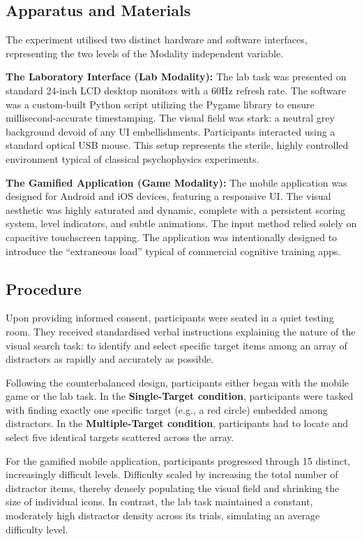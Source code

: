 \documentclass[11pt,a4paper]{article}
\begin{document}
\subsection{Apparatus and Materials}
The experiment utilised two distinct hardware and software interfaces, representing the two levels of the Modality independent variable.

\textbf{The Laboratory Interface (Lab Modality):}
The lab task was presented on standard 24-inch LCD desktop monitors with a 60Hz refresh rate. The software was a custom-built Python script utilizing the Pygame library to ensure millisecond-accurate timestamping. The visual field was stark: a neutral grey background devoid of any UI embellishments. Participants interacted using a standard optical USB mouse. This setup represents the sterile, highly controlled environment typical of classical psychophysics experiments. 

\textbf{The Gamified Application (Game Modality):}
The mobile application was designed for Android and iOS devices, featuring a responsive UI. The visual aesthetic was highly saturated and dynamic, complete with a persistent scoring system, level indicators, and subtle animations. The input method relied solely on capacitive touchscreen tapping. The application was intentionally designed to introduce the ``extraneous load'' typical of commercial cognitive training apps.

\subsection{Procedure}
Upon providing informed consent, participants were seated in a quiet testing room. They received standardised verbal instructions explaining the nature of the visual search task: to identify and select specific target items among an array of distractors as rapidly and accurately as possible.

Following the counterbalanced design, participants either began with the mobile game or the lab task. 
In the \textbf{Single-Target condition}, participants were tasked with finding exactly one specific target (e.g., a red circle) embedded among distractors. 
In the \textbf{Multiple-Target condition}, participants had to locate and select five identical targets scattered across the array.

For the gamified mobile application, participants progressed through 15 distinct, increasingly difficult levels. Difficulty scaled by increasing the total number of distractor items, thereby densely populating the visual field and shrinking the size of individual icons. In contrast, the lab task maintained a constant, moderately high distractor density across its trials, simulating an average difficulty level.
\end{document}
